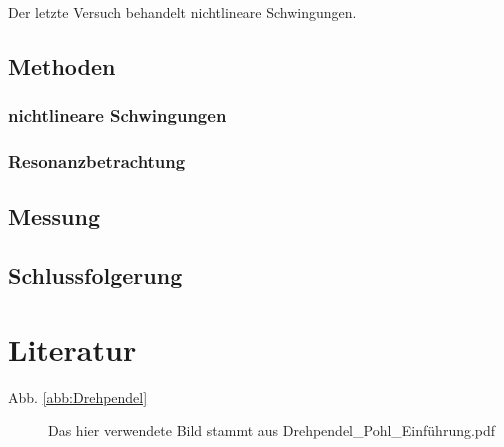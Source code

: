 \documentclass[11pt,a4paper,titlepage, ngerman]{article}
\newcommand{\refabb}[1]{Abb. \ref{abb:#1}}
\begin{document}
		Der letzte Versuch behandelt nichtlineare Schwingungen. %
		
		\subsection*{Methoden}
			
			\subsubsection*{nichtlineare Schwingungen}
			
			
			\subsubsection*{Resonanzbetrachtung}
			
		
		\subsection*{Messung}
			
			
		\subsection*{Schlussfolgerung}
			

	\newpage			
	\section*{Literatur}
		\begin{description}
			\item[\refabb{Drehpendel}] Das hier verwendete Bild stammt aus \glqq Drehpendel\_Pohl\_Einführung.pdf\grqq
		\end{description}
\end{document}
